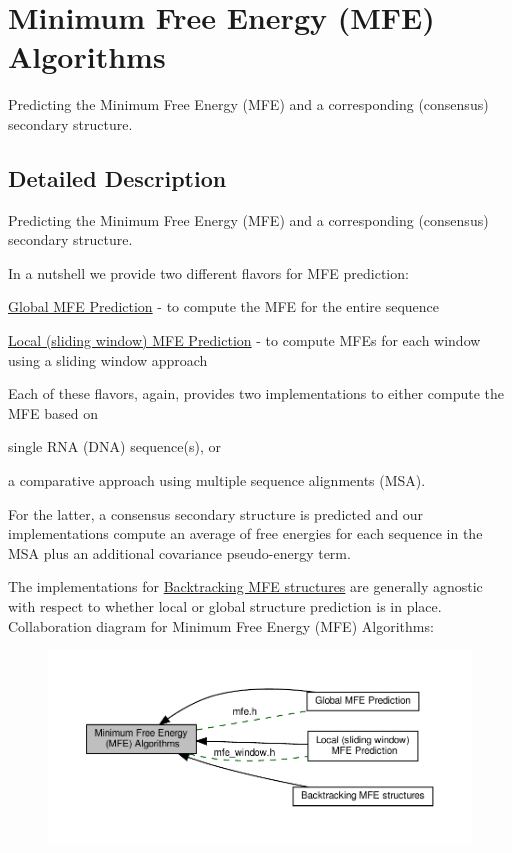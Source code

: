 \hypertarget{group__mfe}{}\section{Minimum Free Energy (M\+FE) Algorithms}
\label{group__mfe}


Predicting the Minimum Free Energy (M\+FE) and a corresponding (consensus) secondary structure.  




\subsection{Detailed Description}
Predicting the Minimum Free Energy (M\+FE) and a corresponding (consensus) secondary structure. 

In a nutshell we provide two different flavors for M\+FE prediction\+:
\begin{DoxyItemize}
\item \hyperlink{group__mfe__global}{Global M\+FE Prediction} -\/ to compute the M\+FE for the entire sequence
\item \hyperlink{group__mfe__window}{Local (sliding window) M\+FE Prediction} -\/ to compute M\+F\+Es for each window using a sliding window approach
\end{DoxyItemize}

Each of these flavors, again, provides two implementations to either compute the M\+FE based on
\begin{DoxyItemize}
\item single R\+NA (D\+NA) sequence(s), or
\item a comparative approach using multiple sequence alignments (M\+SA).
\end{DoxyItemize}

For the latter, a consensus secondary structure is predicted and our implementations compute an average of free energies for each sequence in the M\+SA plus an additional covariance pseudo-\/energy term.

The implementations for \hyperlink{group__mfe__backtracking}{Backtracking M\+FE structures} are generally agnostic with respect to whether local or global structure prediction is in place. Collaboration diagram for Minimum Free Energy (M\+FE) Algorithms\+:
\nopagebreak
\begin{figure}[H]
\begin{center}
\leavevmode
\includegraphics[width=350pt]{group__mfe}
\end{center}
\end{figure}
